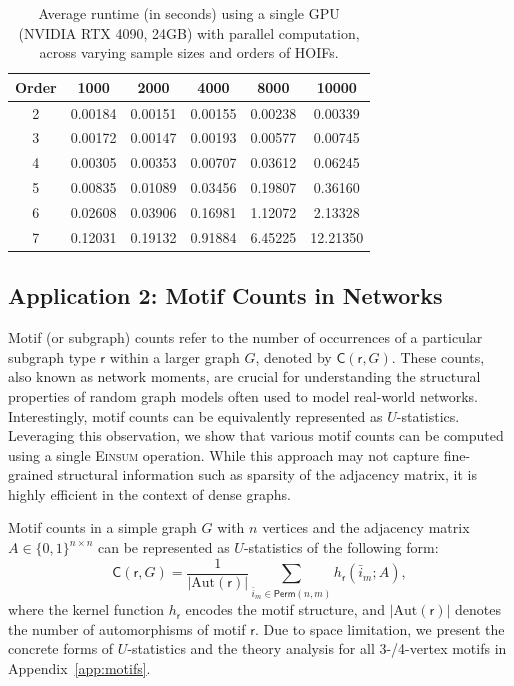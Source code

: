\documentclass[12pt]{article}
\theoremstyle{plain}
\theoremstyle{definition}
\def\Einsum{\textsc{Einsum}}
\def\sfr{\mathsf{r}}
\newcommand{\perm}[1]{\mathsf{Perm}(#1)}
\newcommand{\motifrg}[2]{\mathsf{C}(#1,#2)}
\begin{document}
\begin{bibunit}[agsm]
\begin{table}[ht]
\centering
\caption{Average runtime (in seconds) using a single GPU (NVIDIA RTX 4090, 24GB) with parallel computation, across varying sample sizes and orders of HOIFs.}
\label{tab:HOIF_GPU}
\begin{tabular}{cccccc}
\toprule
\textbf{Order} & \textbf{1000} & \textbf{2000} & \textbf{4000} & \textbf{8000} & \textbf{10000} \\
\midrule
2 & 0.00184 & 0.00151 & 0.00155 & 0.00238 & 0.00339 \\
3 & 0.00172 & 0.00147 & 0.00193 & 0.00577 & 0.00745 \\
4 & 0.00305 & 0.00353 & 0.00707 & 0.03612 & 0.06245 \\
5 & 0.00835 & 0.01089 & 0.03456 & 0.19807 & 0.36160 \\
6 & 0.02608 & 0.03906 & 0.16981 & 1.12072 & 2.13328 \\
7 & 0.12031 & 0.19132 & 0.91884 & 6.45225 & 12.21350 \\
\bottomrule
\end{tabular}
\end{table}
\fi

\subsection{Application 2: Motif Counts in Networks}
\label{sec:example_motif}

Motif (or subgraph) counts refer to the number of occurrences of a particular subgraph type $\sfr$ within a larger graph $G$, denoted by $\motifrg{\sfr}{G}$. These counts, also known as network moments, are crucial for understanding the structural properties of random graph models often used to model real-world networks. %
Interestingly, motif counts can be equivalently represented as $U$-statistics. Leveraging this observation, we show that various motif counts can be computed using a single \Einsum{} operation. While this approach may not capture fine-grained structural information such as sparsity of the adjacency matrix, it is highly efficient in the context of dense graphs.


Motif counts in a simple graph $G$ with $n$ vertices and the adjacency matrix $A \in \{0,1\}^{n \times n}$ can be represented as $U$-statistics of the following form:
\begin{equation*}
\motifrg{\sfr}{G} = \frac{1}{|\mathrm{Aut}(\sfr)|} \sum_{ \bar{i}_{m} \in \perm{n,m}} h_{\sfr} (\bar{i}_{m}; A),
\end{equation*}
where the kernel function $h_{\sfr}$ encodes the motif structure, and $|\mathrm{Aut} (\sfr)|$ denotes the number of automorphisms of motif $\sfr$. %
Due to space limitation, we present the concrete forms of $U$-statistics and the theory analysis for all 3-/4-vertex motifs in Appendix~\ref{app:motifs}.



\end{bibunit}
\end{document}
